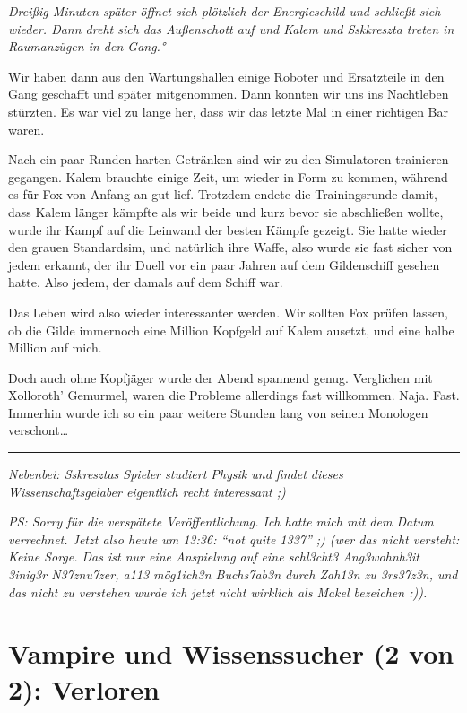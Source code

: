 \documentclass[11pt]{scrartcl}
\begin{document}
\emph{Dreißig Minuten später öffnet sich plötzlich der Energieschild und
schließt sich wieder. Dann dreht sich das Außenschott auf und Kalem und
Sskkreszta treten in Raumanzügen in den Gang.°}

Wir haben dann aus den Wartungshallen einige Roboter und Ersatzteile in
den Gang geschafft und später mitgenommen. Dann konnten wir uns ins
Nachtleben stürzten. Es war viel zu lange her, dass wir das letzte Mal
in einer richtigen Bar waren.

Nach ein paar Runden harten Getränken sind wir zu den Simulatoren
trainieren gegangen. Kalem brauchte einige Zeit, um wieder in Form zu
kommen, während es für Fox von Anfang an gut lief. Trotzdem endete die
Trainingsrunde damit, dass Kalem länger kämpfte als wir beide und kurz
bevor sie abschließen wollte, wurde ihr Kampf auf die Leinwand der
besten Kämpfe gezeigt. Sie hatte wieder den grauen Standardsim, und
natürlich ihre Waffe, also wurde sie fast sicher von jedem erkannt, der
ihr Duell vor ein paar Jahren auf dem Gildenschiff gesehen hatte. Also
jedem, der damals auf dem Schiff war.

Das Leben wird also wieder interessanter werden. Wir sollten Fox prüfen
lassen, ob die Gilde immernoch eine Million Kopfgeld auf Kalem ausetzt,
und eine halbe Million auf mich.

Doch auch ohne Kopfjäger wurde der Abend spannend genug. Verglichen mit
Xolloroth' Gemurmel, waren die Probleme allerdings fast willkommen.
Naja. Fast. Immerhin wurde ich so ein paar weitere Stunden lang von
seinen Monologen verschont\ldots{}

\begin{center}\rule{3in}{0.4pt}\end{center}

\emph{Nebenbei: Sskresztas Spieler studiert Physik und findet dieses
Wissenschaftsgelaber eigentlich recht interessant ;)}

\emph{PS: Sorry für die verspätete Veröffentlichung. Ich hatte mich mit
dem Datum verrechnet. Jetzt also heute um 13:36: ``not quite 1337'' ;)
(wer das nicht versteht: Keine Sorge. Das ist nur eine Anspielung auf
eine schl3cht3 Ang3wohnh3it 3inig3r N37znu7zer, a113 mög1ich3n
Buchs7ab3n durch Zah13n zu 3rs37z3n, und das nicht zu verstehen wurde
ich jetzt nicht wirklich als Makel bezeichen :)).}

\section{Vampire und Wissenssucher (2 von 2): Verloren}
\end{document}
